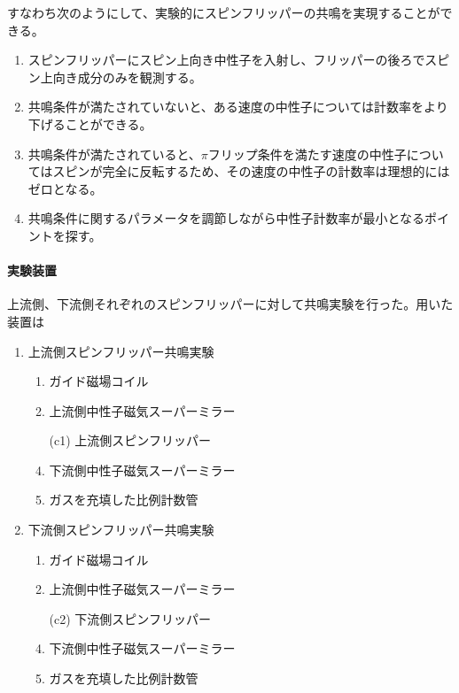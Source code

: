 すなわち次のようにして、実験的にスピンフリッパーの共鳴を実現することができる。
\begin{enumerate}
\item スピンフリッパーにスピン上向き中性子を入射し、フリッパーの後ろでスピン上向き成分のみを観測する。
\item 共鳴条件が満たされていないと、ある速度の中性子については計数率をより下げることができる。
\item 共鳴条件が満たされていると、$\pi$フリップ条件を満たす速度の中性子についてはスピンが完全に反転するため、その速度の中性子の計数率は理想的にはゼロとなる。
\item 共鳴条件に関するパラメータを調節しながら中性子計数率が最小となるポイントを探す。
\end{enumerate}


\paragraph{実験装置}
上流側、下流側それぞれのスピンフリッパーに対して共鳴実験を行った。用いた装置は
\vspace{5mm}
\begin{minipage}{0.5\hsize}
\begin{enumerate}
\item 上流側スピンフリッパー共鳴実験
\begin{enumerate}
\item ガイド磁場コイル
\item 上流側中性子磁気スーパーミラー
\item[(c1)] 上流側スピンフリッパー
\setcounter{enumii}{3}
\item 下流側中性子磁気スーパーミラー
\item {}ガスを充填した比例計数管
\end{enumerate}
\end{enumerate}
\end{minipage}
\begin{minipage}{0.5\hsize}
\begin{enumerate}
\setcounter{enumi}{1}
\item 下流側スピンフリッパー共鳴実験
\begin{enumerate}
\item ガイド磁場コイル
\item 上流側中性子磁気スーパーミラー
\item[(c2)] 下流側スピンフリッパー
\setcounter{enumii}{3}
\item 下流側中性子磁気スーパーミラー
\item {}ガスを充填した比例計数管
\end{enumerate}
\end{enumerate}
\end{minipage}
\vspace{5mm}

